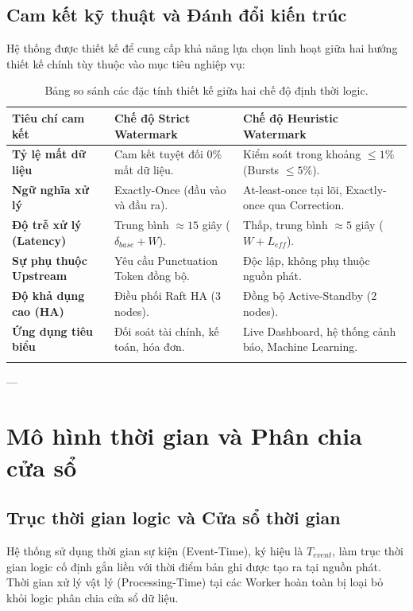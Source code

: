 \documentclass[12pt,a4paper]{article}
\begin{document}
\subsection{Cam kết kỹ thuật và Đánh đổi kiến trúc}
Hệ thống được thiết kế để cung cấp khả năng lựa chọn linh hoạt giữa hai hướng thiết kế chính tùy thuộc vào mục tiêu nghiệp vụ:

\begin{longtable}{p{} p{} p{}}
\toprule
\textbf{Tiêu chí cam kết} & \textbf{Chế độ Strict Watermark} & \textbf{Chế độ Heuristic Watermark} \\
\midrule
\endhead
\textbf{Tỷ lệ mất dữ liệu} & Cam kết tuyệt đối 0\% mất dữ liệu. & Kiểm soát trong khoảng $\le 1\%$ (Bursts $\le 5\%$). \\
\textbf{Ngữ nghĩa xử lý} & Exactly-Once (đầu vào và đầu ra). & At-least-once tại lõi, Exactly-once qua Correction. \\
\textbf{Độ trễ xử lý (Latency)} & Trung bình $\approx 15$ giây ($\delta_{base} + W$). & Thấp, trung bình $\approx 5$ giây ($W + L_{eff}$). \\
\textbf{Sự phụ thuộc Upstream} & Yêu cầu Punctuation Token đồng bộ. & Độc lập, không phụ thuộc nguồn phát. \\
\textbf{Độ khả dụng cao (HA)} & Điều phối Raft HA (3 nodes). & Đồng bộ Active-Standby (2 nodes). \\
\textbf{Ứng dụng tiêu biểu} & Đối soát tài chính, kế toán, hóa đơn. & Live Dashboard, hệ thống cảnh báo, Machine Learning. \\
\bottomrule
\caption{Bảng so sánh các đặc tính thiết kế giữa hai chế độ định thời logic.}
\end{longtable}

---

\section{Mô hình thời gian và Phân chia cửa sổ}

\subsection{Trục thời gian logic và Cửa sổ thời gian}
Hệ thống sử dụng thời gian sự kiện (Event-Time), ký hiệu là $T_{event}$, làm trục thời gian logic cố định gắn liền với thời điểm bản ghi được tạo ra tại nguồn phát. Thời gian xử lý vật lý (Processing-Time) tại các Worker hoàn toàn bị loại bỏ khỏi logic phân chia cửa sổ dữ liệu.
\end{document}
